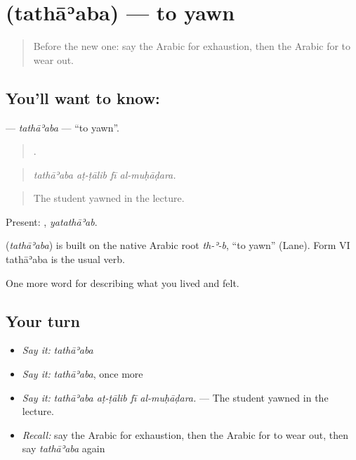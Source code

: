 \section[\texorpdfstring{\ar{تثاءب} (tathāʾaba)}{تثاءب (tathāʾaba)}]{ (tathāʾaba) — to yawn}

\label{lesson:AR-C514-tathaaba}



\begin{quote}
Before the new one: say the Arabic for exhaustion, then the Arabic for to wear out.
\end{quote}

\subsection*{You'll want to know: }
\textbf{} — \emph{tathāʾaba} — \textquotedblleft{}to yawn\textquotedblright{}.

\begin{quote}
   .
\end{quote}

\begin{quote}
\emph{tathāʾaba aṭ-ṭālib fī al-muḥāḍara.}
\end{quote}

\begin{quote}
The student yawned in the lecture.
\end{quote}

Present: , \emph{yatathāʾab}.

\begin{cousinweb}
\textbf{} (\emph{tathāʾaba}) is built on the native Arabic root \emph{th-ʾ-b}, \textquotedblleft{}to yawn\textquotedblright{} (Lane). Form VI tathāʾaba is the usual verb.
\end{cousinweb}

\begin{grammarlens}[title={What you've built}]
One more word for describing what you lived and felt.
\end{grammarlens}

\subsection*{Your turn}
\begin{itemize}
\raggedright
  \item \emph{Say it:} \emph{tathāʾaba}
  \item \emph{Say it:} \emph{tathāʾaba}, once more
  \item \emph{Say it:} \emph{tathāʾaba aṭ-ṭālib fī al-muḥāḍara.} — The student yawned in the lecture.
  \item \emph{Recall:} say the Arabic for exhaustion, then the Arabic for to wear out, then say \emph{tathāʾaba} again
\end{itemize}

